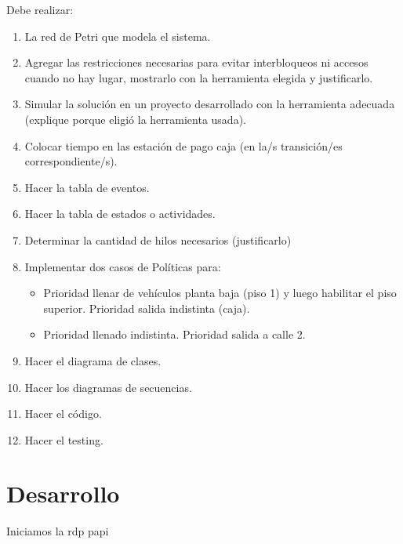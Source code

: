\documentclass[12pt,a4paper]{article}
\begin{document}
Debe realizar:
\begin{enumerate}
\item La red de Petri que modela el sistema.
\item Agregar las restricciones necesarias para evitar interbloqueos ni accesos cuando no hay lugar, mostrarlo con la herramienta elegida y justificarlo.
\item Simular la solución en un proyecto desarrollado con la herramienta adecuada (explique porque eligió la herramienta usada).
\item Colocar tiempo en las estación de pago caja (en la/s transición/es correspondiente/s).
\item Hacer la tabla de eventos.
\item Hacer la tabla de estados o actividades.
\item Determinar la cantidad de hilos necesarios (justificarlo)
\item Implementar dos casos de Políticas para:

\begin{itemize}
\item Prioridad llenar de vehículos planta baja (piso 1) y luego habilitar el piso superior. Prioridad salida indistinta (caja).
\item Prioridad llenado indistinta. Prioridad salida a calle 2.
\end{itemize}

\item Hacer el diagrama de clases.
\item Hacer los diagramas de secuencias.
\item Hacer el código.
\item Hacer el testing.
\end{enumerate}

\section{Desarrollo}
\label{desarrollo}

Iniciamos la rdp papi 
\end{document}
